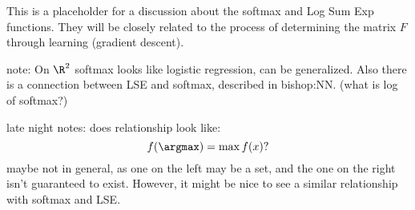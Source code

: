 This is a placeholder for a discussion about the softmax and Log Sum Exp functions.  They will be closely related to the process of determining the matrix $F$ through learning (gradient descent).

note: On $\R^2$ softmax looks like logistic regression, can be generalized.  Also there is a connection between LSE and softmax, described in bishop:NN.
(what is log of softmax?) 

late night notes:
does relationship look like:
\[f(\argmax)=\max f(x)?\]
maybe not in general, as one on the left may be a set, and the one on the right isn't guaranteed to exist.
However, it might be nice to see a similar relationship with softmax and LSE.